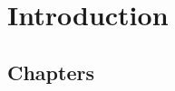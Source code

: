 \documentclass[
reprint,
amsmath,amssymb,
aip,
jap,
floatfix,
]{revtex4-2}
\begin{document}
\listoftables    %
\listoffigures   %

\newpage
{}  %



\chapter{Introduction}

   
\section{Chapters}
\label{sec:chap}


% 
% 
% 
% 
% 
% 

\end{document}
